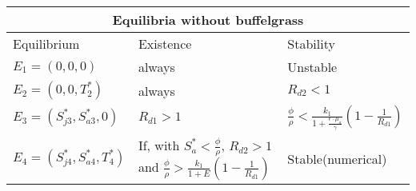 \setlength{\arrayrulewidth}{.5mm}
\setlength{\tabcolsep}{18pt}
\renewcommand{\arraystretch}{1.5}

\hspace{-.8cm}\begin{tabular}{ |p{3cm}|p{4cm}|p{4.5cm}|}
\hline
\multicolumn{3}{|c|}{Equilibria without buffelgrass} \\ 
\hline
Equilibrium & Existence & Stability \\
\hline
$E_1= (0,0,0)$ & always & Unstable\\

$E_2= (0,0,T_2^*)$ & always & $R_{d2} < 1$ \\

$E_3= (S_{j3}^*, S_{a3}^*, 0)$ &  $R_{d1} > 1$& $\displaystyle\frac {\phi}{\rho}<\displaystyle\frac{k_1}{1+\displaystyle\frac{\epsilon\cdot\mu_a}{\gamma}}\left(1-\displaystyle\frac{1}{R_{d1}}\right) $ \\

$E_4= (S_{j4}^*, S_{a4}^*, T_4^*)$ & \hspace{-.5cm} 
If, with $S_a^* < \frac{\phi}{\rho}$, $R_{d2} > 1$ and $\displaystyle \frac{\phi}{\rho} > \displaystyle\frac{k_1}{1+E}\left(1 - \displaystyle\frac{1}{R_{d1}}\right)$& Stable(numerical)\\


\hline

\end{tabular}